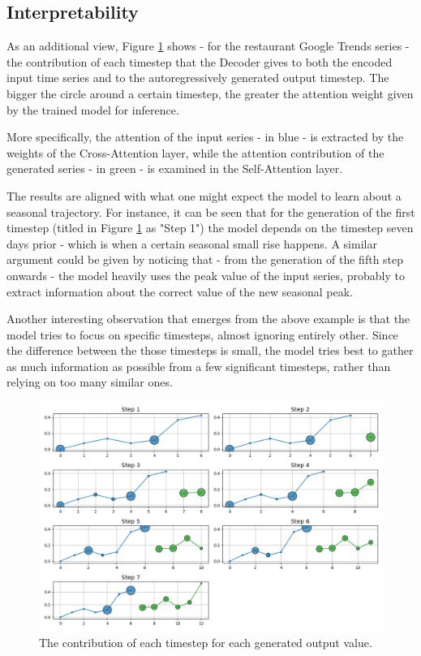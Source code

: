 \documentclass[algorithms,article,submit,pdftex,moreauthors]{Definitions/mdpi}
\begin{document}
\subsection{Interpretability}
As an additional view, Figure \ref{fig:attention} shows - for the restaurant Google Trends series - the contribution of each timestep that the Decoder gives to both the encoded input time series and to the autoregressively generated output timestep. The bigger the circle around a certain timestep, the greater the attention weight given by the trained model for inference.

More specifically, the attention of the input series - in blue - is extracted by the weights of the Cross-Attention layer, while the attention contribution of the generated series - in green - is examined in the Self-Attention layer.

The results are aligned with what one might expect the model to learn about a seasonal trajectory. For instance, it can be seen that for the generation of the first timestep (titled in Figure \ref{fig:attention} as "Step 1") the model depends on the timestep seven days prior - which is when a certain seasonal small rise happens. A similar argument could be given by noticing that - from the generation of the fifth step onwards - the model heavily uses the peak value of the input series, probably to extract information about the correct value of the new seasonal peak.

Another interesting observation that emerges from the above example is that the model tries to focus on specific timesteps, almost ignoring entirely other. Since the difference between the those timesteps is small, the model tries best to gather as much information as possible from a few significant timesteps, rather than relying on too many similar ones.

\begin{figure}
	\centering
	\includegraphics[width=1.0\linewidth]{attention.png}
	\caption{The contribution of each timestep for each generated output value.}
	\label{fig:attention}
\end{figure}
\end{document}

